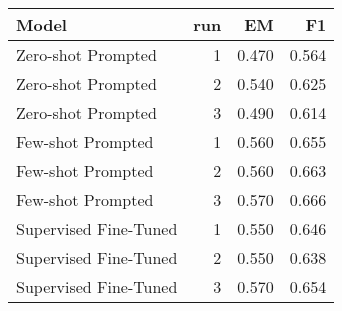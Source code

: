 \begin{tabular}{lrrr}
\toprule
Model & run & EM & F1 \\
\midrule
Zero-shot Prompted & 1 & 0.470 & 0.564 \\
Zero-shot Prompted & 2 & 0.540 & 0.625 \\
Zero-shot Prompted & 3 & 0.490 & 0.614 \\
Few-shot Prompted & 1 & 0.560 & 0.655 \\
Few-shot Prompted & 2 & 0.560 & 0.663 \\
Few-shot Prompted & 3 & 0.570 & 0.666 \\
Supervised Fine-Tuned & 1 & 0.550 & 0.646 \\
Supervised Fine-Tuned & 2 & 0.550 & 0.638 \\
Supervised Fine-Tuned & 3 & 0.570 & 0.654 \\
\bottomrule
\end{tabular}
